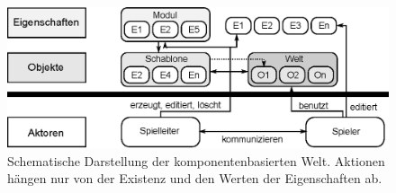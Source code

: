 
\begin{figure}
	\centering
		\includegraphics[width=1.00\textwidth]{media/konzept_schema.eps}
	\caption{Schematische Darstellung der komponentenbasierten Welt. Aktionen hängen nur von der Existenz und den Werten der Eigenschaften ab.}
	\label{fig:konzept_schema}
\end{figure}

